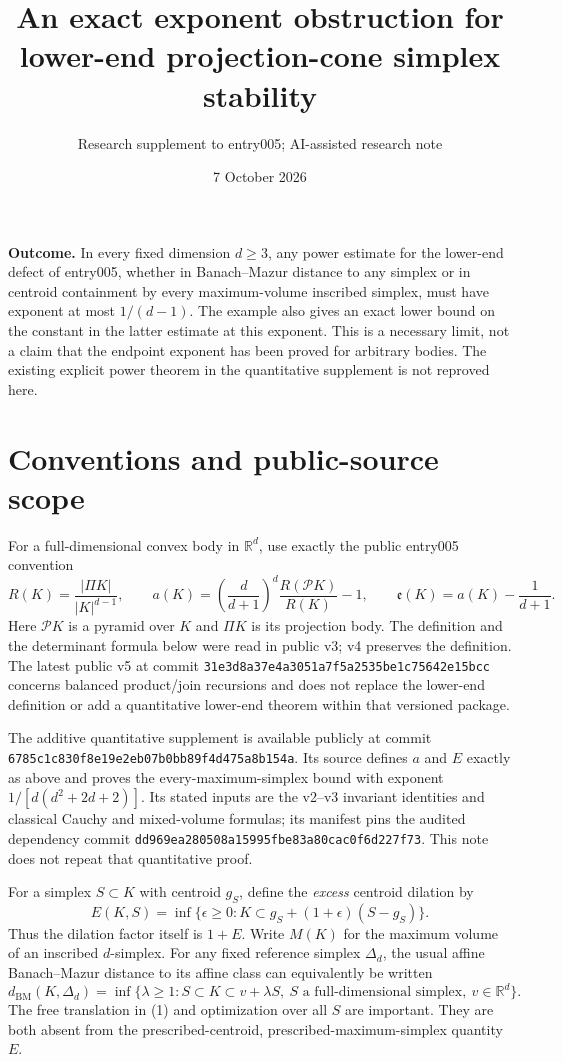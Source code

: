 \documentclass[11pt]{article}
\title{An exact exponent obstruction for lower-end projection-cone simplex stability}
\author{Research supplement to entry005; AI-assisted research note}
\date{7 October 2026}
\newcommand{\BM}{d_{\mathrm{BM}}}
\newcommand{\ee}{\mathfrak e}
\begin{document}
\maketitle

\noindent\textbf{Outcome.} In every fixed dimension $d\ge3$, any power estimate for
the lower-end defect of entry005, whether in Banach--Mazur distance to any simplex
or in centroid containment by every maximum-volume inscribed simplex, must have
exponent at most $1/(d-1)$. The example also gives an exact lower bound on the
constant in the latter estimate at this exponent. This is a necessary limit,
not a claim that the endpoint exponent has been proved for arbitrary bodies.
The existing explicit power theorem in the quantitative supplement is not reproved here.

\section{Conventions and public-source scope}

For a full-dimensional convex body in $\mathbb R^d$, use exactly the public
entry005 convention
\[
 R(K)=\frac{|\Pi K|}{|K|^{d-1}},\qquad
 a(K)=\left(\frac d{d+1}\right)^d\frac{R(\mathcal P K)}{R(K)}-1,
 \qquad \ee(K)=a(K)-\frac1{d+1}.
\]
Here $\mathcal P K$ is a pyramid over $K$ and $\Pi K$ is its projection body.
The definition and the determinant formula below were read in public v3;
v4 preserves the definition. The latest public v5 at commit
\nolinkurl{31e3d8a37e4a3051a7f5a2535be1c75642e15bcc} concerns balanced
product/join recursions and does not replace the lower-end definition or add
a quantitative lower-end theorem within that versioned package.

The additive quantitative supplement is available publicly
at commit \nolinkurl{6785c1c830f8e19e2eb07b0bb89f4d475a8b154a}.
Its source defines $a$ and $E$ exactly as above and proves the
every-maximum-simplex bound with exponent
$1/[d(d^2+2d+2)]$. Its stated inputs are the v2--v3 invariant identities
and classical Cauchy and mixed-volume formulas; its manifest pins the
audited dependency commit
\nolinkurl{dd969ea280508a15995fbe83a80cac0f6d227f73}.
This note does not repeat that quantitative proof.

For a simplex $S\subset K$ with centroid $g_S$, define the \emph{excess}
centroid dilation by
\[
 E(K,S)=\inf\{\epsilon\ge0:K\subset g_S+(1+\epsilon)(S-g_S)\}.
\]
Thus the dilation factor itself is $1+E$. Write $M(K)$ for the maximum volume
of an inscribed $d$-simplex. For any fixed reference simplex $\Delta_d$, the
usual affine Banach--Mazur distance to its affine class can equivalently be
written
\[
 \BM(K,\Delta_d)=\inf\{\lambda\ge1:
 S\subset K\subset v+\lambda S,
 \ S\text{ a full-dimensional simplex},\ v\in\mathbb R^d\}.
 \tag{1}
\]
The free translation in (1) and optimization over all $S$ are important.
They are both absent from the prescribed-centroid, prescribed-maximum-simplex
quantity $E$.
\end{document}
